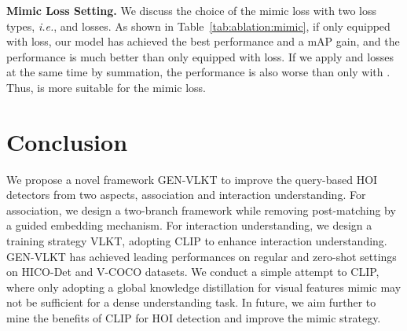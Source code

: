 \documentclass[10pt,twocolumn,letterpaper]{article}
\begin{document}
\vspace{0.5mm}\noindent\textbf{Mimic Loss Setting.} We discuss the choice of the mimic loss with two loss types, \emph{i.e.},  and  losses. As shown in Table~\ref{tab:ablation:mimic}, if only equipped with  loss, our model has achieved the best performance and a  mAP gain, and the performance is much better than only equipped with  loss. If we apply  and  losses at the same time by summation, the performance is also worse than only with . Thus,  is more suitable for the mimic loss.  

\vspace{-2.5mm}\section{Conclusion}\vspace{-2mm}
We propose a novel framework GEN-VLKT to improve the query-based HOI detectors from two aspects, association and interaction understanding. For association, we design a two-branch framework while removing post-matching by a guided embedding mechanism. For interaction understanding, we design a training strategy VLKT, adopting CLIP to enhance interaction understanding. GEN-VLKT has achieved leading performances on regular and zero-shot settings on HICO-Det and V-COCO datasets. We conduct a simple attempt to CLIP, where only adopting a global knowledge distillation for visual features mimic may not be sufficient for a dense understanding task. In future, we aim further to mine the benefits of CLIP for HOI detection and improve the mimic strategy.







{\small


}
\end{document}
